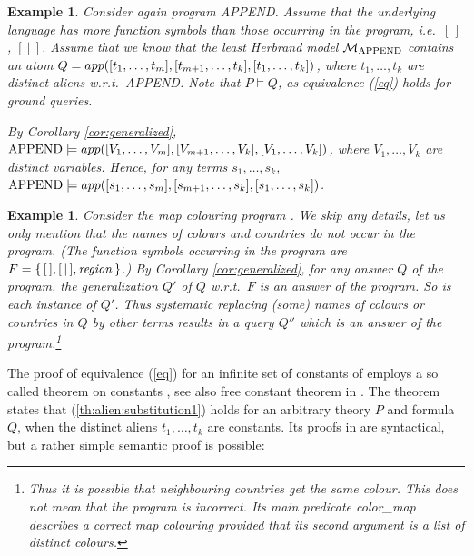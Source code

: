 \documentclass[a4paper]{tlp2}
\newtheorem{example}[theorem]{Example}
\newcommand*{\seq}[2][n]  {{#2_{1}, \allowbreak \ldots, \allowbreak #2_{#1}}}
\newcommand*{\SEQ}[3]
            {{\ensuremath{#1_{#2}, \allowbreak \ldots, \allowbreak #1_{#3}}}}
\newcommand*{\M}{{\ensuremath{\cal M}}\xspace}
\begin{document}
\begin{example}
Consider again program APPEND.  Assume that the underlying language 
has more function symbols than those occurring in the program, 
i.e.\  $[\,]$,  $[\ |\ ]$.
Assume that we know that the least Herbrand model $\M_{\rm APPEND}$
contains an atom
  $Q =\linebreak[3] app([\seq[m]t], [\SEQ{t}{m+1}k], [\seq[k]t])$,
where $\seq[k]t$ are distinct aliens w.r.t.\ APPEND.
Note that $P\models Q$, as equivalence (\ref{eq}) holds for ground queries.
{\sloppy\par}



By Corollary \ref{cor:generalized},
  ${\rm APPEND}\models  app([\seq[m]V], [\SEQ{V}{m+1}k], [\seq[k]V])$,
where $\seq[k] V$ are distinct variables.
Hence, for any terms $\seq[k] s$,
\mbox{${\rm APPEND}\models  app([\seq[m]s], [\SEQ{s}{m+1}k], [\seq[k] s])$}.
{\sloppy\par}
\end{example}




\begin{example}
 Consider the map colouring program  \cite[Program 14.4]{Sterling-Shapiro}.
We skip any details, let us only mention that the names of colours and
 countries do not occur in the program.
 (The function symbols occurring in the program are 
 $F=\{\, [\,],
[\, |\,],
 {\it region}   \,\}
 $.)
By Corollary  \ref{cor:generalized},
 for any answer $Q$ of the program,
 the generalization $Q'$ of $Q$ w.r.t.\ $F$ is an
 answer of the program.  So is each instance of $Q'$.  
 Thus systematic replacing (some) names of colours or countries in $Q$ by
 other terms results in a query $Q''$ which is an answer of the program.\footnote{Thus it is possible that neighbouring countries get the same colour.
This does not mean that the program is incorrect.
Its main predicate {\it color\_map}
describes a correct map colouring provided that its second argument
is a list of distinct colours.
} 
\end{example}











The proof of equivalence (\ref{eq})
for an infinite set of constants of 
\cite[proof of Prop.\,6]{DBLP:books/mk/minker88/Maher88} employs a so called
theorem on constants  \cite{shoenfield67},
see also free constant theorem in \cite[p.\,56]{HandbookLAILP:FOL}.
The theorem states that (\ref{th:alien:substitution1}) holds for an arbitrary
theory $P$ and formula $Q$, when the distinct aliens $\seq[k]t$ are constants.
Its proofs in \cite{shoenfield67,HandbookLAILP:FOL} are syntactical, but a
rather simple semantic proof is possible:
\end{document}

